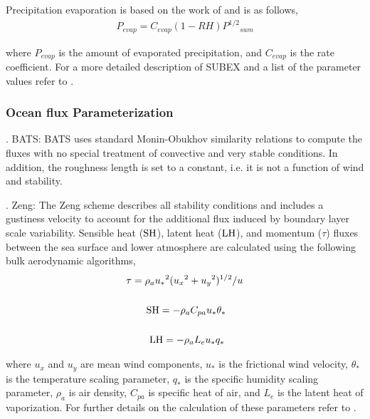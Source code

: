 Precipitation evaporation is based on the work of \cite{Sundqvist_89} and is as
follows, \begin{eqnarray} P_{evap} = C_{evap} (1-RH) {P^{1/2}}_{sum}
\end{eqnarray}

\noindent where $P_{evap}$ is the amount of evaporated precipitation, and
$C_{evap}$ is the rate coefficient.  For a more detailed description of SUBEX
and a list of the parameter values refer to \cite{Pal_00}. 



\subsubsection{Ocean flux Parameterization} .  BATS: {BATS} uses
standard Monin-Obukhov similarity relations to compute the fluxes with no
special treatment of convective and very stable conditions.  In addition, the
roughness length is set to a constant, i.e. it is not a function of wind and
stability.  

.  Zeng:  The Zeng scheme describes all stability conditions and
includes a gustiness velocity to account for the additional flux induced by
boundary layer scale variability. Sensible heat (${\rm SH}$), latent heat (${\rm
LH}$), and momentum ($\tau$) fluxes between the sea surface and lower atmosphere
are calculated using the following bulk aerodynamic algorithms, \begin{eqnarray}
\tau = \rho_a {u_{\ast}}^2 ({u_{x}}^2 + {u_{y}}^2)^{1/2} / u \\ \nonumber \\
{\rm SH} = -\rho_a C_{pa} u_{\ast} \theta_{\ast} \hspace{.6cm} \\ \nonumber \\
{\rm LH} =  -\rho_a L_{e} u_{\ast} q_{\ast}  \hspace{.65cm} \end{eqnarray}

\noindent where $u_x$ and $u_y$ are mean wind components, $u_{\ast}$ is the
frictional wind velocity, $\theta_{\ast}$ is the temperature scaling parameter,
$q_{\ast}$ is the specific humidity scaling parameter,  $\rho_a$ is air density,
$C_{pa}$ is specific heat of air, and $L_{e}$ is the latent heat of
vaporization.  For further details on the calculation of these parameters refer
to \cite{Zeng_98}.
 

